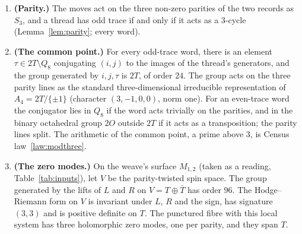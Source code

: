\begin{theorem}\label{thm:triplet}
\begin{enumerate}
\item \textbf{(Parity.)} The moves act on the three non-zero parities of the two records as $S_3$, and a thread has odd
  trace if and only if it acts as a $3$-cycle (Lemma~\ref{lem:parity}; every word).
\item \textbf{(The common point.)} For every odd-trace word, there is an element $\tau\in2T\setminus Q_8$ conjugating
  $(i,j)$ to the images of the thread's generators, and the group generated by $i,j,\tau$ is $2T$, of order $24$. The group
  acts on the three parity lines as the standard three-dimensional irreducible representation of $A_4=2T/\{\pm1\}$
  (character $(3,-1,0,0)$, norm one). For an even-trace word the conjugator lies in $Q_8$ if the word acts trivially on the
  parities, and in the binary octahedral group $2O$ outside $2T$ if it acts as a transposition; the parity lines split.
  The arithmetic of the common point, a prime above $3$, is Census law~\ref{law:modthree}.
\item \textbf{(The zero modes.)} On the weave's surface $M_{1,2}$ (taken as a reading, Table~\ref{tab:inputs}), let $V$ be
  the parity-twisted spin space. The group generated by the lifts of $L$ and $R$ on $V=T\oplus\bar T$ has order $96$. The
  Hodge--Riemann form on $V$ is invariant under $L$, $R$ and the sign, has signature $(3,3)$ and is positive definite on
  $T$. The punctured fibre with this local system has three holomorphic zero modes, one per parity, and they span $T$.
\end{enumerate}
\end{theorem}

